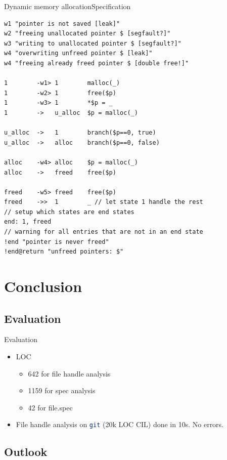 \documentclass{beamer}
\newcommand{\inlineSh}[1]{\lstinline[language=Bash]$#1$}
\begin{document}
\begin{frame}{Dynamic memory allocation}{Specification}
\begin{lstlisting}[basicstyle=\scriptsize\ttfamily]
w1 "pointer is not saved [leak]"
w2 "freeing unallocated pointer $ [segfault?]"
w3 "writing to unallocated pointer $ [segfault?]"
w4 "overwriting unfreed pointer $ [leak]"
w4 "freeing already freed pointer $ [double free!]"

1        -w1> 1        malloc(_)
1        -w2> 1        free($p)
1        -w3> 1        *$p = _
1        ->   u_alloc  $p = malloc(_)

u_alloc  ->   1        branch($p==0, true)
u_alloc  ->   alloc    branch($p==0, false)

alloc    -w4> alloc    $p = malloc(_)
alloc    ->   freed    free($p)

freed    -w5> freed    free($p)
freed    ->>  1        _ // let state 1 handle the rest
// setup which states are end states
end: 1, freed
// warning for all entries that are not in an end state
!end "pointer is never freed"
!end@return "unfreed pointers: $"
\end{lstlisting}
\end{frame}


\section{Conclusion}

\subsection{Evaluation}

\begin{frame}[fragile]{Evaluation}
\begin{itemize}
\item LOC
	\begin{itemize}
	\item 642 for file handle analysis \pause
	\item 1159 for spec analysis \pause
	\item 42 for file.spec \pause
	\end{itemize}
\item File handle analysis on \inlineSh{git} (20k LOC CIL) done in 10s. No errors.
\end{itemize}
\end{frame}


\subsection{Outlook}
\end{document}
